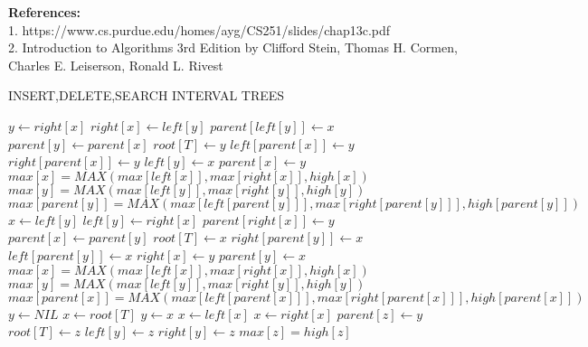 \documentclass[11pt]{article}
\begin{document}
\textbf{References:}\\
1. https://www.cs.purdue.edu/homes/ayg/CS251/slides/chap13c.pdf
\\
2. Introduction to Algorithms 3rd Edition by Clifford Stein, Thomas H. Cormen, Charles E. Leiserson, Ronald L. Rivest
\begin{algorithm}[h]
\caption{INSERT,DELETE,SEARCH INTERVAL TREES}\label{euclid}
\begin{algorithmic}[1]
\State $y \gets right[x]$
\State $right[x] \gets left[y]$
\State $parent[left[y]] \gets x$ 
\EndIf
\State $parent[y] \gets parent[x]$
\State $root[T] \gets y$
\State $left[parent[x]] \gets y$
\Else 
\State $right[parent[x]] \gets y$
\EndIf
\State $ left[y] \gets x$
\State $ parent[x] \gets y$
\State $max[x]=MAX(max[left[x]],max[right[x]],high[x])$ 
\State $max[y]=MAX(max[left[y]],max[right[y]],high[y])$
\State $max[parent[y]]=MAX(max[left[parent[y]]],max[right[parent[y]]],high[parent[y]])$
\EndProcedure
\\
 
\State $x \gets left[y]$
\State $left[y] \gets right[x]$
\State $parent[right[x]] \gets y$
\EndIf
\State $parent[x] \gets parent[y]$
\State $root[T] \gets x$
\State $right[parent[y]] \gets x$
\Else 
\State $left[parent[y]] \gets x$
\EndIf
\State $ right[x] \gets y$
\State $ parent[y] \gets x$
\State $max[x]=MAX(max[left[x]],max[right[x]],high[x])$
\State $max[y]=MAX(max[left[y]],max[right[y]],high[y])$
\State $max[parent[x]]=MAX(max[left[parent[x]]],max[right[parent[x]]],high[parent[x]])$
\EndProcedure
\\
\State $y \gets \textit{NIL}$
\State $x \gets root[T]$
\State $ y \gets x$
\State $x \gets left[x]$
\Else
\State $x \gets right[x]$
\EndIf
\EndWhile
\State $parent[z] \gets y$
\State $root[T] \gets z$ 
\State $left[y] \gets z$
\Else
\State $right[y] \gets z$
\EndIf
\State $max[z]=high[z]$
\EndProcedure
\\
\end{algorithmic}
\end{algorithm}
\end{document}
